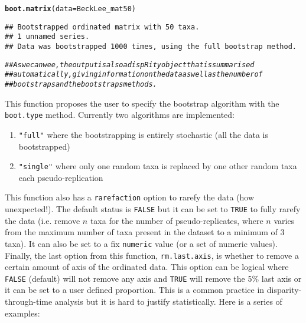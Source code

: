 \documentclass{article}\usepackage[]{graphicx}\usepackage[]{color}
\makeatletter
\newcommand{\hlcom}[1]{\textcolor[rgb]{0.678,0.584,0.686}{\textit{#1}}}%
\newcommand{\hlstd}[1]{\textcolor[rgb]{0.345,0.345,0.345}{#1}}%
\newcommand{\hlkwc}[1]{\textcolor[rgb]{0.333,0.667,0.333}{#1}}%
\newcommand{\hlkwd}[1]{\textcolor[rgb]{0.737,0.353,0.396}{\textbf{#1}}}%
\newenvironment{kframe}{%
 \def\at@end@of@kframe{}%
 \ifinner\ifhmode%
  \def\at@end@of@kframe{\end{minipage}}%
  \begin{minipage}{\columnwidth}%
 \fi\fi%
 \def\FrameCommand##1{\hskip\@totalleftmargin \hskip-\fboxsep
 \colorbox{shadecolor}{##1}\hskip-\fboxsep
     \hskip-\linewidth \hskip-\@totalleftmargin \hskip\columnwidth}%
 \MakeFramed {\advance\hsize-\width
   \@totalleftmargin\z@ \linewidth\hsize
   \@setminipage}}%
 {\par\unskip\endMakeFramed%
 \at@end@of@kframe}
\newenvironment{knitrout}{}{} %
\makeatother
\begin{document}
\begin{knitrout}
\color{fgcolor}\begin{kframe}
\begin{alltt}
\hlkwd{boot.matrix}\hlstd{(}\hlkwc{data} \hlstd{= BeckLee_mat50)}
\end{alltt}
\begin{verbatim}
## Bootstrapped ordinated matrix with 50 taxa. 
## 1 unnamed series.
## Data was bootstrapped 1000 times, using the full bootstrap method.
\end{verbatim}
\begin{alltt}
\hlcom{## As we can wee, the output is also a dispRity object that is summarised}
\hlcom{## automatically, giving information on the data as well as the number of}
\hlcom{## bootstraps and the bootstraps methods.}
\end{alltt}
\end{kframe}
\end{knitrout}

This function proposes the user to specify the bootstrap algorithm with the \texttt{boot.type} method.
Currently two algorithms are implemented:
\begin{enumerate}
\item \texttt{"full"} where the bootstrapping is entirely stochastic (all the data is bootstrapped)
\item \texttt{"single"} where only one random taxa is replaced by one other random taxa each pseudo-replication
\end{enumerate}
This function also has a \texttt{rarefaction} option to rarefy the data (how unexpected!).
The default status is \texttt{FALSE} but it can be set to \texttt{TRUE} to fully rarefy the data (i.e. remove $n$ taxa for the number of pseudo-replicates, where $n$ varies from the maximum number of taxa present in the dataset to a minimum of 3 taxa).
It can also be set to a fix \texttt{numeric} value (or a set of numeric values).
Finally, the last option from this function, \texttt{rm.last.axis}, is whether to remove a certain amount of axis of the ordinated data.
This option can be logical where \texttt{FALSE} (default) will not remove any axis and \texttt{TRUE} will remove the 5\% last axis or it can be set to a user defined proportion.
This is a common practice in disparity-through-time analysis but it is hard to justify statistically.
Here is a series of examples:
\end{document}
